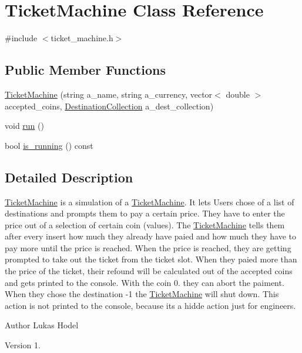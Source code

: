 \hypertarget{classTicketMachine}{\section{Ticket\-Machine Class Reference}
\label{classTicketMachine}
}


{\ttfamily \#include $<$ticket\-\_\-machine.\-h$>$}

\subsection*{Public Member Functions}
\begin{DoxyCompactItemize}
\item 
\hyperlink{classTicketMachine_a0998a05992b29ec22d4063f9d93a096a}{Ticket\-Machine} (string a\-\_\-name, string a\-\_\-currency, vector$<$ double $>$ accepted\-\_\-coins, \hyperlink{classDestinationCollection}{Destination\-Collection} a\-\_\-dest\-\_\-collection)
\item 
void \hyperlink{classTicketMachine_a8d68bde6ee1a9a5f08182df963c1b0a9}{run} ()
\item 
bool \hyperlink{classTicketMachine_acaef19321ea4f8f647c86f514608b99a}{is\-\_\-running} () const 
\end{DoxyCompactItemize}


\subsection{Detailed Description}
\hyperlink{classTicketMachine}{Ticket\-Machine} is a simulation of a \hyperlink{classTicketMachine}{Ticket\-Machine}. It lets Users chose of a list of destinations and prompts them to pay a certain price. They have to enter the price out of a selection of certain coin (values). The \hyperlink{classTicketMachine}{Ticket\-Machine} tells them after every insert how much they already have paied and how much they have to pay more until the price is reached. When the price is reached, they are getting prompted to take out the ticket from the ticket slot. When they paied more than the price of the ticket, their refound will be calculated out of the accepted coins and gets printed to the console. With the coin 0. they can abort the paiment. When they chose the destination -\/1 the \hyperlink{classTicketMachine}{Ticket\-Machine} will shut down. This action is not printed to the console, because its a hidde action just for engineers.

\begin{DoxyAuthor}{Author}
Lukas Hodel 
\end{DoxyAuthor}
\begin{DoxyVersion}{Version}
1. 
\end{DoxyVersion}


